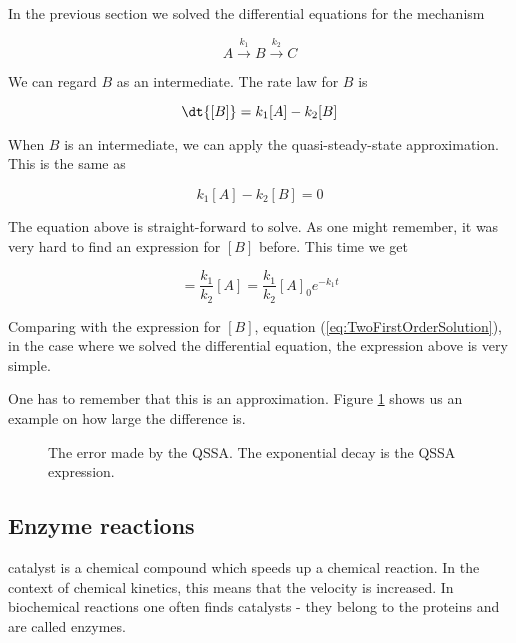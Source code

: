 \begin{example}
    In the previous section we solved the differential equations for the mechanism

    \begin{equation}
        A \overset{k_1}{\rightarrow} B \overset{k_2}{\rightarrow} C
    \end{equation}

    We can regard $B$ as an intermediate. The rate law for $B$ is

    \begin{equation}
        \dt{[B]} = k_1[A] - k_2[B]
    \end{equation}

    When $B$ is an intermediate, we can apply the quasi-steady-state approximation. This is the same as

    \begin{equation}
        k_1[A] - k_2[B] = 0
    \end{equation}

    The equation above is straight-forward to solve. As one might remember, it was very hard to find an expression for $[B]$ before. This time we get

    \begin{equation}
        [B] = \frac{k_1}{k_2}[A] = \frac{k_1}{k_2}[A]_0e^{-k_1t}
    \end{equation}

    Comparing with the expression for $[B]$, equation (\ref{eq:TwoFirstOrderSolution}), in the case where we solved the differential equation, the expression above is very simple.

    One has to remember that this is an approximation. Figure \ref{fig:QSSAerror} shows us an example on how large the difference is.
\end{example}

\begin{figure}
    \caption{The error made by the QSSA. The exponential decay is the QSSA expression.}
    \label{fig:QSSAerror}
\end{figure}

\subsection{Enzyme reactions}
\label{sect:EnzymeReactions}

catalyst is a chemical compound which speeds up a chemical reaction. In the context of chemical kinetics, this means that the velocity is increased. In biochemical reactions one often finds catalysts - they belong to the proteins and are called enzymes.

